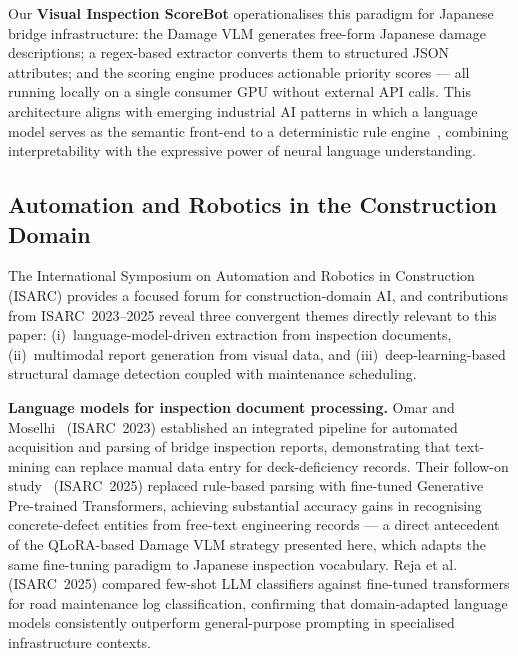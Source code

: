 \documentclass[twocolumn]{article}
\begin{document}
Our \textbf{Visual Inspection ScoreBot} operationalises this paradigm for
Japanese bridge infrastructure: the Damage VLM generates free-form Japanese
damage descriptions; a regex-based extractor converts them to structured
JSON attributes; and the scoring engine produces actionable priority
scores --- all running locally on a single consumer GPU without external API
calls.
This architecture aligns with emerging industrial AI patterns in which a
language model serves as the semantic front-end to a deterministic rule
engine~\cite{liu2024llava,dettmers2023qlora}, combining interpretability
with the expressive power of neural language understanding.

\subsection{Automation and Robotics in the Construction Domain}

The International Symposium on Automation and Robotics in Construction
(ISARC) provides a focused forum for construction-domain AI, and
contributions from ISARC~2023--2025 reveal three convergent themes
directly relevant to this paper: (i)~language-model-driven extraction
from inspection documents, (ii)~multimodal report generation from visual
data, and (iii)~deep-learning-based structural damage detection coupled
with maintenance scheduling.

\textbf{Language models for inspection document processing.}
Omar and Moselhi~\cite{omar2023bridge} (ISARC~2023) established an
integrated pipeline for automated acquisition and parsing of bridge
inspection reports, demonstrating that text-mining can replace manual
data entry for deck-deficiency records.
Their follow-on study~\cite{omar2025bridge} (ISARC~2025) replaced
rule-based parsing with fine-tuned Generative Pre-trained Transformers,
achieving substantial accuracy gains in recognising concrete-defect
entities from free-text engineering records --- a direct antecedent of
the QLoRA-based Damage VLM strategy presented here, which adapts the
same fine-tuning paradigm to Japanese inspection vocabulary.
Reja et al.~\cite{reja2025llm} (ISARC~2025) compared few-shot LLM
classifiers against fine-tuned transformers for road maintenance log
classification, confirming that domain-adapted language models
consistently outperform general-purpose prompting in specialised
infrastructure contexts.
\end{document}
